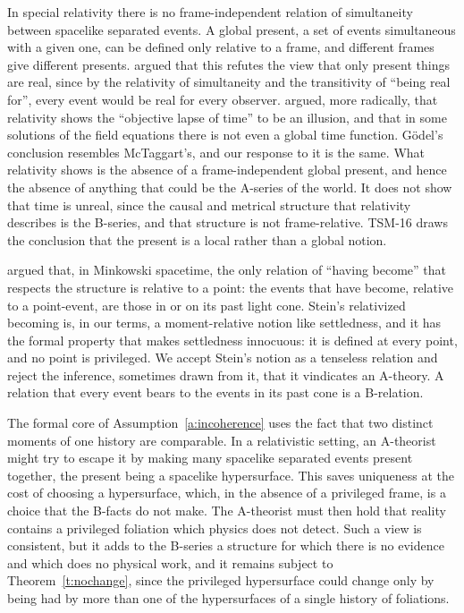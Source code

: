 \documentclass{situationist-preprint}
\begin{document}
In special relativity there is no frame-independent relation of simultaneity between spacelike separated events. A global present, a set of events simultaneous with a given one, can be defined only relative to a frame, and different frames give different presents. \citet{Putnam1967} argued that this refutes the view that only present things are real, since by the relativity of simultaneity and the transitivity of \enquote{being real for}, every event would be real for every observer. \citet{Godel1949} argued, more radically, that relativity shows the \enquote{objective lapse of time} to be an illusion, and that in some solutions of the field equations there is not even a global time function. Gödel's conclusion resembles McTaggart's, and our response to it is the same. What relativity shows is the absence of a frame-independent global present, and hence the absence of anything that could be the A-series of the world. It does not show that time is unreal, since the causal and metrical structure that relativity describes is the B-series, and that structure is not frame-relative. TSM-16 draws the conclusion that the present is a local rather than a global notion.

\citet{Stein1968} argued that, in Minkowski spacetime, the only relation of \enquote{having become} that respects the structure is relative to a point: the events that have become, relative to a point-event, are those in or on its past light cone. Stein's relativized becoming is, in our terms, a moment-relative notion like settledness, and it has the formal property that makes settledness innocuous: it is defined at every point, and no point is privileged. We accept Stein's notion as a tenseless relation and reject the inference, sometimes drawn from it, that it vindicates an A-theory. A relation that every event bears to the events in its past cone is a B-relation.

The formal core of Assumption~\ref{a:incoherence} uses the fact that two distinct moments of one history are comparable. In a relativistic setting, an A-theorist might try to escape it by making many spacelike separated events present together, the present being a spacelike hypersurface. This saves uniqueness at the cost of choosing a hypersurface, which, in the absence of a privileged frame, is a choice that the B-facts do not make. The A-theorist must then hold that reality contains a privileged foliation which physics does not detect. Such a view is consistent, but it adds to the B-series a structure for which there is no evidence and which does no physical work, and it remains subject to Theorem~\ref{t:nochange}, since the privileged hypersurface could change only by being had by more than one of the hypersurfaces of a single history of foliations.
\end{document}
